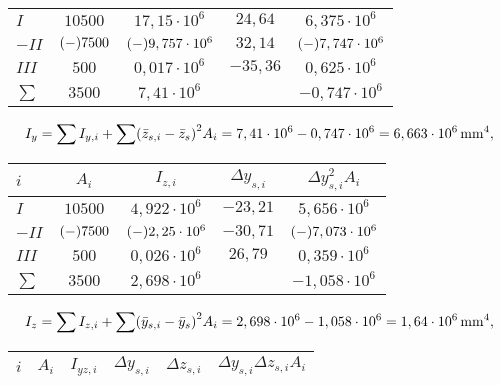 \documentclass{exercise}
\begin{document}
\begin{enumerate}
\begin{center}
\begin{tabular}{lcccc}
                \midrule
                \(I\) & \(10500\) & \(17,15 \cdot 10^6\) & \(24,64\) & \(6,375 \cdot 10^6\)\\
                \(-II\) & \(\parentheses*{-}7500\) & \(\parentheses*{-}9,757 \cdot 10^6\) & \(32,14\) & \(\parentheses*{-}7,747 \cdot 10^6\)\\
                \(III\) & \(500\) & \(0,017 \cdot 10^6\) & \(-35,36\) & \(0,625 \cdot 10^6\)\\
                \midrule
                \(\sum\) & \(3500\) & \(7,41 \cdot 10^6\) & & \(-0,747 \cdot 10^6\)\\
                \bottomrule
            \end{tabular}
        \end{center}
        \[
            I_y = \sum I_{y, i} + \sum\parentheses*{\bar{z}_{s, i} - \bar{z}_s}^2 A_i = 7,41 \cdot 10^6 - 0,747 \cdot 10^6 = 6,663 \cdot 10^6\sis{\milli\meter\tothe{4}},
        \]
        \begin{center}
            \begin{tabular}{lcccc}
                \toprule
                \(i\) & \(A_i\) & \(I_{z, i}\) & \(\Delta y_{s, i}\) & \(\Delta y_{s, i}^2 A_i\)\\
                \midrule
                \(I\) & \(10500\) & \(4,922 \cdot 10^6\) & \(-23,21\) & \(5,656 \cdot 10^6\)\\
                \(-II\) & \(\parentheses*{-}7500\) & \(\parentheses*{-}2,25 \cdot 10^6\) & \(-30,71\) & \(\parentheses*{-}7,073 \cdot 10^6\)\\
                \(III\) & \(500\) & \(0,026 \cdot 10^6\) & \(26,79\) & \(0,359 \cdot 10^6\)\\
                \midrule
                \(\sum\) & \(3500\) & \(2,698 \cdot 10^6\) & & \(-1,058 \cdot 10^6\)\\
                \bottomrule
            \end{tabular}
        \end{center}
        \[
            I_z = \sum I_{z, i} + \sum\parentheses*{\bar{y}_{s, i} - \bar{y}_s}^2 A_i = 2,698 \cdot 10^6 - 1,058 \cdot 10^6 = 1,64 \cdot 10^6\sis{\milli\meter\tothe{4}},
        \]
        \begin{center}
            \begin{tabular}{lccccc}
                \toprule
                \(i\) & \(A_i\) & \(I_{yz, i}\) & \(\Delta y_{s, i}\) & \(\Delta z_{s, i}\) & \(\Delta y_{s, i}\Delta z_{s, i} A_i\)\\
                \midrule

\end{tabular}
\end{center}
\end{enumerate}
\end{document}
